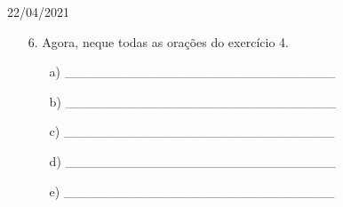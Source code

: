\documentclass{SchoolBook}
\begin{document}
\begin{day}{22/04/2021}
\begin{enumerate}
            \item[6.] Agora, neque todas as orações do exercício 4.
            \begin{enumerate}
                \item[a)] \_\_\_\_\_\_\_\_\_\_\_\_\_\_\_\_\_\_\_\_\_\_\_\_\_\_\_\_\_
                \item[b)] \_\_\_\_\_\_\_\_\_\_\_\_\_\_\_\_\_\_\_\_\_\_\_\_\_\_\_\_\_
                \item[c)] \_\_\_\_\_\_\_\_\_\_\_\_\_\_\_\_\_\_\_\_\_\_\_\_\_\_\_\_\_
                \item[d)] \_\_\_\_\_\_\_\_\_\_\_\_\_\_\_\_\_\_\_\_\_\_\_\_\_\_\_\_\_
                \item[e)] \_\_\_\_\_\_\_\_\_\_\_\_\_\_\_\_\_\_\_\_\_\_\_\_\_\_\_\_\_
            \end{enumerate}
        \end{enumerate}
    \end{day}
\end{document}
